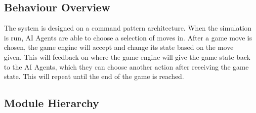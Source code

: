 \documentclass[12pt, titlepage]{article}
\begin{document}
\subsection{Behaviour Overview}
The system is designed on a command pattern architecture. When the simulation is run, AI Agents are able to choose a selection of moves in. After a game move is chosen, the game engine will accept and change its state based on the move given. This will feedback on where the game engine will give the game state back to the AI Agents, which they can choose another action after receiving the game state. This will repeat until the end of the game is reached.  

\newpage
\subsection{Module Hierarchy}
\end{document}
